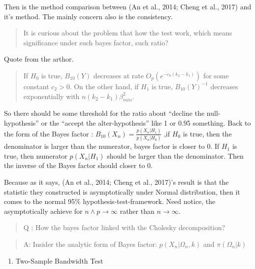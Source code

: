 \documentclass[]{article}
\providecommand{\tightlist}{%
  \setlength{\itemsep}{0pt}\setlength{\parskip}{0pt}}
\begin{document}
Then is the method comparison between (An et al., 2014; Cheng et al.,
2017) and it's method. The mainly concern also is the consistency.

\begin{quote}
It is curious about the problem that how the test work, which means
significance under such bayes factor, such ratio?
\end{quote}

Quote from the arthor.

\begin{quote}
If \(H_0\) is true, \(B_{10}(Y)\) decreases at rate
\(O_p(e^{-c_0(k_2-k_1)})\) for some constant \(c_2>0\). On the other
hand, if \(H_1\) is true, \(B_{10}(Y)^{-1}\) decreases exponentially
with \(n(k_2-k_1)\beta^2_{min}\).
\end{quote}

So there should be some threshold for the ratio about ``decline the
null-hypothesis'' or the ``accept the alter-hypothesis'' like 1 or 0.95
something. Back to the form of the Bayes factor :
\(B_{10}(X_{n})=\frac{p(X_n|H_1)}{p(X_n|H_0)}\) ,if \(H_0\) is true,
then the denominator is larger than the numerator, bayes factor is
closer to 0. If \(H_1\) is true, then numerator \(p(X_n|H_1)\) should be
larger than the denominator. Then the inverse of the Bayes factor should
closer to 0.

Because as it says, (An et al., 2014; Cheng et al., 2017)'s result is
that the statistic they constructed is asymptotically under Normal
distribution, then it comes to the normal 95\%
hypothesis-test-framework. Need notice, the asymptotically achieve for
\(n \wedge p \rightarrow \infty\) rather than \(n \rightarrow \infty\).

\begin{quote}
Q : How the bayes factor linked with the Cholesky decomposition?
\end{quote}

\begin{quote}
A: Insider the analytic form of Bayes factor: \(p(X_n|\Omega_n,k)\) and
\(\pi(\Omega_n|k)\)
\end{quote}

\begin{enumerate}
\def\labelenumi{\arabic{enumi}.}
\setcounter{enumi}{2}
\tightlist
\item
  Two-Sample Bandwidth Test
\end{enumerate}
\end{document}
